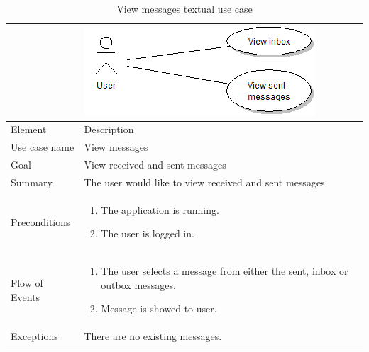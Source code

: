 \begin{table}
\begin{tabular}{p{3cm}p{12cm}}
& \includegraphics{view_messages}\\ \hline
Element & Description \\ \hline
Use case name & View messages \\
Goal & View received and sent messages \\
Summary &The user would like to view received and sent messages \\
Preconditions &
\begin{enumerate}
\item{}The application is running.
\item{}The user is logged in.
\end{enumerate} \\ \hline
Flow of Events &
\begin{enumerate}
\item{}The user selects a message from either the sent, inbox or outbox messages.
\item{}Message is showed to user.
\end{enumerate} \\ \hline
Exceptions & There are no existing messages.
\end{tabular}
\caption{View messages textual use case} \label{tab:viewmessages}
\end{table}

